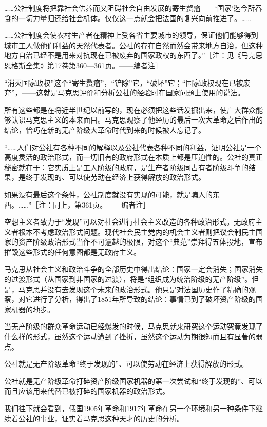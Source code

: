 \documentclass[UTF8, 12pt, a4paper]{ctexrep}
\begin{document}
……公社制度将把靠社会供养而又阻碍社会自由发展的寄生赘瘤——‘国家’迄今所吞食的一切力量归还给社会机体。仅仅这一点就会把法国的复兴向前推进了。……

……公社制度会使农村生产者在精神上受各省主要城市的领导，保证他们能够得到城市工人做他们利益的天然代表者。公社的存在自然而然会带来地方自治，但这种地方自治已经不是用来对抗现在已被废弃的国家政权的东西了。”［注：见《马克思恩格斯全集》第17卷第360—361页。——编者注］

“消灭国家政权”这个“寄生赘瘤”，“铲除”它，“破坏”它；“国家政权现在已被废弃”，——这就是马克思评价和分析公社的经验时在国家问题上使用的说法。

所有这些都是在将近半世纪以前写的，现在必须把这些话发掘出来，使广大群众能够认识马克思主义的本来面目。马克思观察了他经历的最后一次大革命之后作出的结论，恰巧在新的无产阶级大革命时代到来的时候被人忘记了。

“……人们对公社有各种不同的解释以及公社代表各种不同的利益，证明公社是一个高度灵活的政治形式，而一切旧有的政府形式在本质上都是压迫性的。公社的真正秘密就在于：它实质上是工人阶级的政府，是生产者阶级同占有者阶级斗争的结果，是终于发现的、可以使劳动在经济上获得解放的政治形式。

如果没有最后这个条件，公社制度就没有实现的可能，就是骗人的东西。……”［注：同上，第361页。——编者注］

空想主义者致力于“发现”可以对社会进行社会主义改造的各种政治形式。无政府主义者根本不考虑政治形式问题。现代社会民主党内的机会主义者则把议会制民主国家的资产阶级政治形式当作不可逾越的极限，对这个“典范”崇拜得五体投地，宣布摧毁这些形式的任何意图都是无政府主义。

马克思从社会主义和政治斗争的全部历史中得出结论：国家一定会消失；国家消失的过渡形式（从国家到非国家的过渡），将是“组织成为统治阶级的无产阶级”。但是，马克思并没有去发现这个未来的政治形式。他只是对法国历史作了精确的观察，对它进行了分析，得出了1851年所导致的结论：事情已到了破坏资产阶级的国家机器的地步。

当无产阶级的群众革命运动已经爆发的时候，马克思就来研究这个运动究竟发现了什么样的形式，虽然这个运动遭到了挫折，虽然这个运动为期很短而且有显著的弱点。

公社就是无产阶级革命“终于发现的”、可以使劳动在经济上获得解放的形式。

公社就是无产阶级革命打碎资产阶级国家机器的第一次尝试和“终于发现的”、可以而且应该用来代替已被打碎的国家机器的政治形式。

我们往下就会看到，俄国1905年革命和1917年革命在另一个环境和另一种条件下继续着公社的事业，证实着马克思这种天才的历史的分析。
\end{document}
